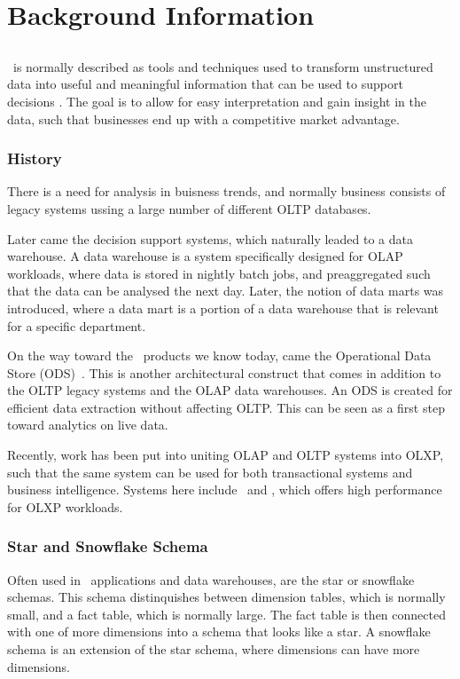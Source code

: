 \chapter{Background Information}
\label{chap:background}
\clearpage

\section{\bi}
\label{sec:Business Intelligence}
\bi~is normally described as tools and techniques used to transform unstructured data into useful and meaningful information that can be used to support decisions \cite{Wikipedia_contributors2015-ag}. The goal is to allow for easy interpretation and gain insight in the data, such that businesses end up with a competitive market advantage.


\subsection{History}
\label{sub:History}
There is a need for analysis in buisness trends, and normally business consists of legacy systems ussing a large number of different OLTP databases.

Later came the decision support systems, which naturally leaded to a data warehouse. A data warehouse is a system specifically designed for OLAP workloads, where data is stored in nightly batch jobs, and preaggregated such that the data can be analysed the next day. Later, the notion of data marts was introduced, where a data mart is a portion of a data warehouse that is relevant for a specific department.

On the way toward the \bd~products we know today, came the Operational Data Store (ODS)~\cite{Pavlic2002-nm}. This is another architectural construct that comes in addition to the OLTP legacy systems and the OLAP data warehouses. An ODS is created for efficient data extraction without affecting OLTP. This can be seen as a first step toward analytics on live data.

Recently, work has been put into uniting OLAP and OLTP systems into OLXP, such that the same system can be used for both transactional systems and business intelligence. Systems here include \hyper~and \hyrise, which offers high performance for OLXP workloads. 

\subsection{Star and Snowflake Schema}
\label{sub:Star and Snowflake Schema}
Often used in \bi~applications and data warehouses, are the star or snowflake schemas. This schema distinquishes between dimension tables, which is normally small, and a fact table, which is normally large. The fact table is then connected with one of more dimensions into a schema that looks like a star. A snowflake schema is an extension of the star schema, where dimensions can have more dimensions. 

